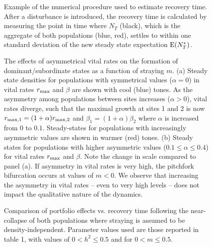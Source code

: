\documentclass{revtex4}
\newcommand{\beginsupplement}{%
        \clearpage
        \setcounter{table}{0}
        \renewcommand{\thetable}{S\arabic{table}}%
        \setcounter{figure}{0}
        \renewcommand{\thefigure}{S\arabic{figure}}%
     }
\begin{document}

\beginsupplement



\begin{figure}
  \captionsetup{justification=raggedright,
singlelinecheck=false
}
\centering
\caption{
Example of the numerical procedure used to estimate recovery time. After a disturbance is introduced, the recovery time is calculated by measuring the point in time where $N_T$ (black), which is the aggregate of both populations (blue, red), settles to within one standard deviation of the new steady state expectation ${\rm E}(N_T^*)$. 
} \label{fig:recovery}
\end{figure}



\begin{figure}
  \captionsetup{justification=raggedright,
singlelinecheck=false
}
\centering
\caption{
The effects of asymmetrical vital rates on the formation of dominant/subordinate states as a function of straying $m$. 
(a) Steady state densities for populations with symmetrical values ($\alpha=0$) in vital rates $r_{\rm max}$ and $\beta$ are shown with cool (blue) tones.
As the asymmetry among populations between sites increases ($\alpha>0$), vital rates diverge, such that the maximal growth at sites 1 and 2 is now $r_{\rm max,1}=(1 + \alpha)r_{\rm max,2}$ and $\beta_1=(1+\alpha)\beta_2$ where $\alpha$ is increased from $0$ to $0.1$.
Steady-states for populations with increasingly asymmetric values are shown in warmer (red) tones.
(b) Steady states for populations with higher asymmetric values ($0.1 \leq \alpha \leq 0.4$) for vital rates $r_{\rm max}$ and $\beta$. Note the change in scale compared to panel (a). 
If asymmetry in vital rates is very high, the pitchfork bifurcation occurs at values of $m<0$.
We observe that increasing the asymmetry in vital rates -- even to very high levels -- does not impact the qualitative nature of the dynamics.
} \label{fig:symmetry}
\end{figure}




\begin{figure}
  \captionsetup{justification=raggedright,
singlelinecheck=false
}
\centering
\caption{
Comparison of portfolio effects vs. recovery time following the near-collapse of both populations where straying is assumed to be density-independent.
Parameter values used are those reported in table 1, with values of $ 0 < h^2 \leq 0.5$ and for $0 < m \leq 0.5$.} \label{fig:pevsrt}
\end{figure}
\end{document}

